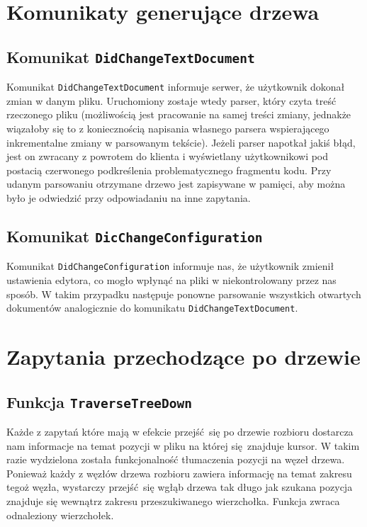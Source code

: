 \section{Komunikaty generujące drzewa}
\subsection{Komunikat \texttt{DidChangeTextDocument}}
Komunikat \texttt{DidChangeTextDocument} informuje serwer, że użytkownik dokonał zmian w danym pliku. Uruchomiony zostaje wtedy parser, który czyta treść rzeczonego pliku (możliwością jest pracowanie na samej treści zmiany, jednakże wiązałoby się to z koniecznością napisania własnego parsera wspierającego inkrementalne zmiany w parsowanym tekście). Jeżeli parser napotkał jakiś błąd, jest on zwracany z powrotem do klienta i wyświetlany użytkownikowi pod postacią czerwonego podkreślenia problematycznego fragmentu kodu. Przy udanym parsowaniu otrzymane drzewo jest zapisywane w pamięci, aby można było je odwiedzić przy odpowiadaniu na inne zapytania.

\subsection{Komunikat \texttt{DicChangeConfiguration}}
Komunikat \texttt{DidChangeConfiguration} informuje nas, że użytkownik zmienił ustawienia edytora, co mogło wpłynąć na pliki w niekontrolowany przez nas sposób. W takim przypadku następuje ponowne parsowanie wszystkich otwartych dokumentów analogicznie do komunikatu \texttt{DidChangeTextDocument}.

\section{Zapytania przechodzące po drzewie}
\subsection{Funkcja \texttt{TraverseTreeDown}}
Każde z zapytań które mają w efekcie przejść się po drzewie rozbioru dostarcza nam informacje na temat pozycji w pliku na której się znajduje kursor. W takim razie wydzielona została funkcjonalność tłumaczenia pozycji na węzeł drzewa. Ponieważ każdy z węzłów drzewa rozbioru zawiera informację na temat zakresu tegoż węzła, wystarczy przejść się wgłąb drzewa tak długo jak szukana pozycja znajduje się wewnątrz zakresu przeszukiwanego wierzchołka. Funkcja zwraca odnaleziony wierzchołek.

